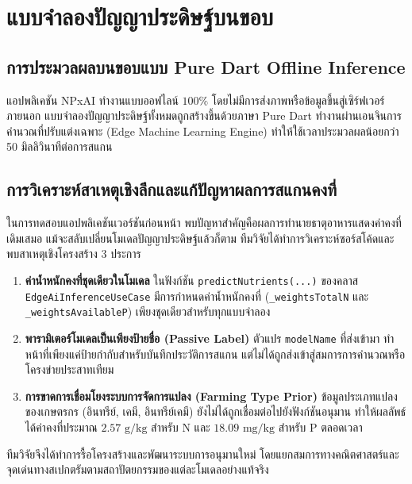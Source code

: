 \documentclass[12pt,a4paper,oneside]{book}
\begin{document}
\chapter{แบบจำลองปัญญาประดิษฐ์บนขอบ}

\section{การประมวลผลบนขอบแบบ Pure Dart Offline Inference}
แอปพลิเคชัน NPxAI ทำงานแบบออฟไลน์ $100\%$ โดยไม่มีการส่งภาพหรือข้อมูลขึ้นสู่เซิร์ฟเวอร์ภายนอก แบบจำลองปัญญาประดิษฐ์ทั้งหมดถูกสร้างขึ้นด้วยภาษา Pure Dart ทำงานผ่านเอนจินการคำนวณที่ปรับแต่งเฉพาะ (Edge Machine Learning Engine) ทำให้ใช้เวลาประมวลผลน้อยกว่า 50 มิลลิวินาทีต่อการสแกน

\section{การวิเคราะห์สาเหตุเชิงลึกและแก้ปัญหาผลการสแกนคงที่}
ในการทดสอบแอปพลิเคชันเวอร์ชันก่อนหน้า พบปัญหาสำคัญคือผลการทำนายธาตุอาหารแสดงค่าคงที่เดิมเสมอ แม้จะสลับเปลี่ยนโมเดลปัญญาประดิษฐ์แล้วก็ตาม ทีมวิจัยได้ทำการวิเคราะห์ซอร์สโค้ดและพบสาเหตุเชิงโครงสร้าง 3 ประการ

\begin{enumerate}
    \item \textbf{ค่าน้ำหนักคงที่ชุดเดียวในโมเดล} ในฟังก์ชัน \texttt{predictNutrients(...)} ของคลาส \texttt{EdgeAiInferenceUseCase} มีการกำหนดค่าน้ำหนักคงที่ (\texttt{\_weightsTotalN} และ \texttt{\_weightsAvailableP}) เพียงชุดเดียวสำหรับทุกแบบจำลอง
    \item \textbf{พารามิเตอร์โมเดลเป็นเพียงป้ายชื่อ (Passive Label)} ตัวแปร \texttt{modelName} ที่ส่งเข้ามา ทำหน้าที่เพียงแค่ป้ายกำกับสำหรับบันทึกประวัติการสแกน แต่ไม่ได้ถูกส่งเข้าสู่สมการการคำนวณหรือโครงข่ายประสาทเทียม
    \item \textbf{การขาดการเชื่อมโยงระบบการจัดการแปลง (Farming Type Prior)} ข้อมูลประเภทแปลงของเกษตรกร (อินทรีย์, เคมี, อินทรีย์เคมี) ยังไม่ได้ถูกเชื่อมต่อไปยังฟังก์ชันอนุมาน ทำให้ผลลัพธ์ได้ค่าคงที่ประมาณ $2.57\text{ g/kg}$ สำหรับ N และ $18.09\text{ mg/kg}$ สำหรับ P ตลอดเวลา
\end{enumerate}

ทีมวิจัยจึงได้ทำการรื้อโครงสร้างและพัฒนาระบบการอนุมานใหม่ โดยแยกสมการทางคณิตศาสตร์และจุดเด่นทางสเปกตรัมตามสถาปัตยกรรมของแต่ละโมเดลอย่างแท้จริง
\end{document}
